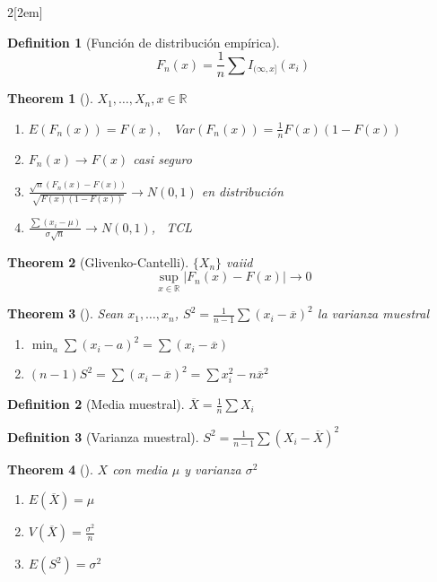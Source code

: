 \documentclass[leqno]{article}
\newtheorem*{theorem}{Theorem}
\newtheorem*{definition}{Definition}
\begin{document}
\begin{multicols}{2}[\columnsep2em]
\begin{definition}[Función de distribución empírica]
  \[
	F_n(x) = \frac{1}{n}\sum I_{(\infty, x]}(x_i)
  \] 
\end{definition}

\begin{theorem}[]$X_1, \ldots, X_n, x \in \mathbb{R}$
  \begin{enumerate}[topsep=-6pt, itemsep=0pt]
	\item $E(F_n(x))=F(x), \quad Var(F_n(x))= \frac{1}{n}F(x)(1-F(x))$
	\item $F_n(x) \to  F(x)$ casi seguro
	\item $\frac{\sqrt{n} (F_n(x)-F(x))}{\sqrt{F(x)(1-F(x))} } \to  N(0,1)$ en distribución
	\item $\frac{\sum (x_i -\mu)}{\sigma \sqrt{n}} \to N(0,1)$, \ TCL
  \end{enumerate}
\end{theorem}

\begin{theorem}[Glivenko-Cantelli] $\{X_n\}$ vaiid 
  \[
	\sup_{x\in \mathbb{R}} |F_n(x)-F(x)| \to 0
  \] 
\end{theorem}

\begin{theorem}[]
Sean $x_1, \ldots, x_n$,  $S^2 =\frac{1}{n-1}\sum (x_i-\overline{x}) ^2$ la varianza muestral
\begin{enumerate}[topsep=-6pt, itemsep=0pt]
  \item $\min_a \sum (x_i-a)^2 = \sum (x_i-\overline{x})$ 
  \item $(n-1)S^2 = \sum (x_i-\overline{x})^2 = \sum x_i^2-n\overline{x}^2$
\end{enumerate}
\end{theorem}

\begin{definition}[Media muestral]
$\overline{X} = \frac{1}{n}\sum X_i$
\end{definition}

\begin{definition}[Varianza muestral]
$S^2 = \frac{1}{n-1}\sum (X_i-\overline{X})^2$
\end{definition}

\begin{theorem}[] $X$ con media  $\mu$ y varianza $\sigma ^2$  
\begin{enumerate}[topsep=-6pt, itemsep=0pt]
  \item $E(\overline{X}) = \mu$
  \item $V(\overline{X}) = \frac{\sigma ^2}{n}$ 
  \item $E(S^2)=\sigma ^2$
\end{enumerate}
\end{theorem}


\end{multicols}
\end{document}
